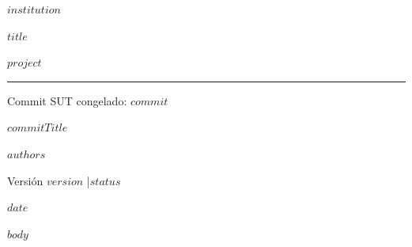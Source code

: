 \documentclass[10pt,a4paper]{article}
\begin{document}
\begin{titlepage}
\thispagestyle{empty}
\centering
\vspace*{1.2cm}
{\large\bfseries $institution$\par}
\vspace{1.2cm}
{\Huge\bfseries\color{gfaccent} $title$\par}
\vspace{0.6cm}
{\Large $project$\par}
\vspace{1.0cm}
\rule{0.6\linewidth}{0.6pt}\par
\vspace{0.8cm}
{\large Commit SUT congelado: \texttt{$commit$}\par}
{\normalsize $commitTitle$\par}
\vspace{0.8cm}
{\large $authors$\par}
\vspace{0.6cm}
{\normalsize Versión $version$ \quad|\quad $status$\par}
{\normalsize $date$\par}
\end{titlepage}
\pagestyle{fancy}
{\hypersetup{linkcolor=black}
\renewcommand{\contentsname}{Contenido}
\tableofcontents}
\clearpage

$body$
\end{document}
